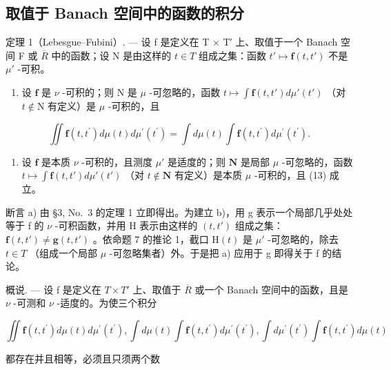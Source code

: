 \subsection{取值于 Banach 空间中的函数的积分}

定理 1（Lebesgue--Fubini）. --- 设 f 是定义在 T × T′ 上、取值于一个 Banach 空间 F 或 \(\overline{R}\) 中的函数；设 N 是由这样的 \(t \in T\) 组成之集：函数 \(t' \mapsto \mathbf{f}(t, t')\) 不是 \(\mu'\) -可积。

\begin{enumerate}
\def\labelenumi{\alph{enumi})}
\tightlist
\item
  设 \(\mathbf{f}\) 是 \(\nu\) -可积的；则 \(\mathrm{N}\) 是 \(\mu\) -可忽略的，函数 \(t \mapsto \int \mathbf{f}(t, t') d\mu'(t')\) （对 \(t \notin \mathrm{N}\) 有定义）是 \(\mu\) -可积的，且
\end{enumerate}

\[
\iint \mathbf {f} (t, t ^ {\prime}) d \mu (t) d \mu^ {\prime} (t ^ {\prime}) = \int d \mu (t) \int \mathbf {f} (t, t ^ {\prime}) d \mu^ {\prime} (t ^ {\prime}).\tag{13}
\]

\begin{enumerate}
\def\labelenumi{\alph{enumi})}
\setcounter{enumi}{1}
\tightlist
\item
  设 \(\mathbf{f}\) 是本质 \(\nu\) -可积的，且测度 \(\mu'\) 是适度的；则 \(\mathbf{N}\) 是局部 \(\mu\) -可忽略的，函数 \(t \mapsto \int \mathbf{f}(t, t') d\mu'(t')\) （对 \(t \notin \mathbf{N}\) 有定义）是本质 \(\mu\) -可积的，且 (13) 成立。
\end{enumerate}

断言 a) 由 §3, No.~3 的定理 1 立即得出。为建立 b)，用 g 表示一个局部几乎处处等于 f 的 \(\nu\) -可积函数，并用 H 表示由这样的 \((t, t')\) 组成之集：\(\mathbf{f}(t, t') \neq \mathbf{g}(t, t')\) 。依命题 7 的推论 1，截口 \(\mathrm{H}(t)\) 是 \(\mu'\) -可忽略的，除去 \(t \in T\) （组成一个局部 \(\mu\) -可忽略集者）外。于是把 a) 应用于 g 即得关于 f 的结论。

概说. --- 设 f 是定义在 \(T \times T'\) 上、取值于 \(\overline{R}\) 或一个 Banach 空间中的函数，且是 \(\nu\) -可测和 \(\nu\) -适度的。为使三个积分

\[
\iint \mathbf {f} (t, t ^ {\prime}) d \mu (t) d \mu^ {\prime} (t ^ {\prime}), \int d \mu (t) \int \mathbf {f} (t, t ^ {\prime}) d \mu^ {\prime} (t ^ {\prime}), \int d \mu^ {\prime} (t ^ {\prime}) \int \mathbf {f} (t, t ^ {\prime}) d \mu (t)
\]

都存在并且相等，必须且只须两个数

